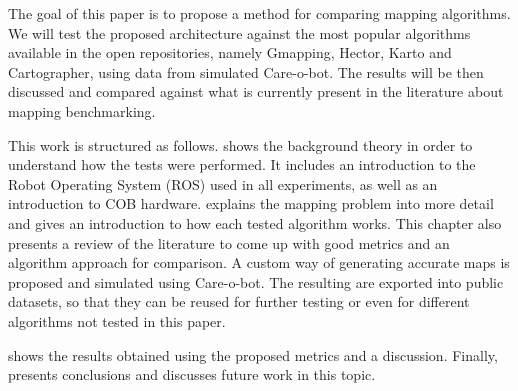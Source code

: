 The goal of this paper is to propose a method for comparing mapping algorithms. We will test the proposed architecture against the most popular algorithms available in the open repositories, namely Gmapping, Hector, Karto and Cartographer, using data from simulated Care-o-bot. The results will be then discussed and compared against what is currently present in the literature about mapping benchmarking.

This work is structured as follows.  shows the background theory in order to understand how the tests were performed. It includes an introduction to the Robot Operating System (ROS) used in all experiments, as well as an introduction to COB hardware.  explains the mapping problem into more detail and gives an introduction to how each tested algorithm works. This chapter also presents a review of the literature to come up with good metrics and an algorithm approach for comparison. A custom way of generating accurate maps is proposed and simulated using Care-o-bot. The resulting are exported into public datasets, so that they can be reused for further testing or even for different algorithms not tested in this paper.

 shows the results obtained using the proposed metrics and a discussion. Finally,  presents conclusions and discusses future work in this topic.











